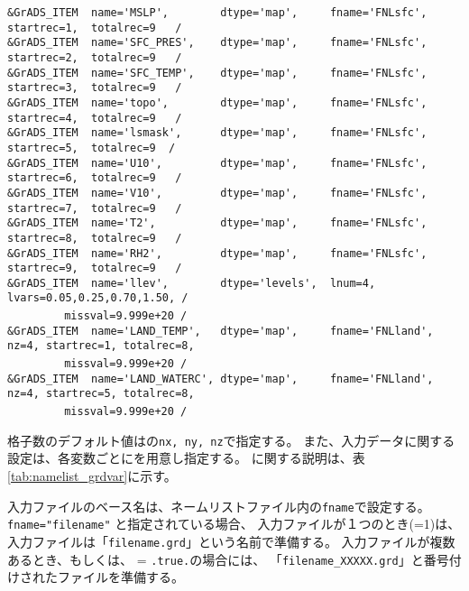 {\verb|&GrADS_ITEM  name='MSLP',        dtype='map',     fname='FNLsfc', startrec=1,  totalrec=9   / |  \\
\verb|&GrADS_ITEM  name='SFC_PRES',    dtype='map',     fname='FNLsfc', startrec=2,  totalrec=9   / |  \\
\verb|&GrADS_ITEM  name='SFC_TEMP',    dtype='map',     fname='FNLsfc', startrec=3,  totalrec=9   / |  \\
\verb|&GrADS_ITEM  name='topo',        dtype='map',     fname='FNLsfc', startrec=4,  totalrec=9   / |  \\
\verb|&GrADS_ITEM  name='lsmask',      dtype='map',     fname='FNLsfc', startrec=5,  totalrec=9  /  |  \\
\verb|&GrADS_ITEM  name='U10',         dtype='map',     fname='FNLsfc', startrec=6,  totalrec=9   / |  \\
\verb|&GrADS_ITEM  name='V10',         dtype='map',     fname='FNLsfc', startrec=7,  totalrec=9   / |  \\
\verb|&GrADS_ITEM  name='T2',          dtype='map',     fname='FNLsfc', startrec=8,  totalrec=9   / |  \\
\verb|&GrADS_ITEM  name='RH2',         dtype='map',     fname='FNLsfc', startrec=9,  totalrec=9   / |  \\
\verb|&GrADS_ITEM  name='llev',        dtype='levels',  lnum=4, lvars=0.05,0.25,0.70,1.50, /        |  \\
~~~~~~~~\verb| missval=9.999e+20 /|  \\
\verb|&GrADS_ITEM  name='LAND_TEMP',   dtype='map',     fname='FNLland', nz=4, startrec=1, totalrec=8,|\\
~~~~~~~~\verb| missval=9.999e+20 /|  \\
\verb|&GrADS_ITEM  name='LAND_WATERC', dtype='map',     fname='FNLland', nz=4, startrec=5, totalrec=8,|\\
~~~~~~~~\verb| missval=9.999e+20 /|  \\
}


格子数のデフォルト値はの\verb|nx, ny, nz|で指定する。
また、入力データに関する設定は、各変数ごとにを用意し指定する。
に関する説明は、表\ref{tab:namelist_grdvar}に示す。

入力ファイルのベース名は、ネームリストファイル内の\verb|fname|で設定する。
\verb|fname="filename"| と指定されている場合、
入力ファイルが１つのとき(=1)は、入力ファイルは「\verb|filename.grd|」という名前で準備する。
入力ファイルが複数あるとき、もしくは、 = \verb|.true.|の場合には、
「\verb|filename_XXXXX.grd|」と番号付けされたファイルを準備する。

